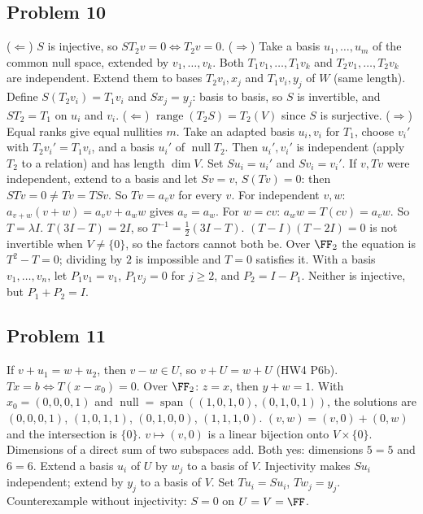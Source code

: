 \documentclass[11pt]{scrartcl}
\DeclareMathOperator{\nul}{null}
\DeclareMathOperator{\range}{range}
\DeclareMathOperator{\spn}{span}
\begin{document}
\subsection*{Problem 10}
\begin{enumerate}[(a)]
  \ii ($\Leftarrow$) $S$ is injective, so $ST_2v=0\iff T_2v=0$.
  ($\Rightarrow$) Take a basis $u_1,\dots,u_m$ of the common null space, extended by $v_1,\dots,v_k$.
  Both $T_1v_1,\dots,T_1v_k$ and $T_2v_1,\dots,T_2v_k$ are independent.
  Extend them to bases $T_2v_i,x_j$ and $T_1v_i,y_j$ of $W$ (same length).
  Define $S(T_2v_i)=T_1v_i$ and $Sx_j=y_j$: basis to basis, so $S$ is invertible, and $ST_2=T_1$ on $u_i$ and $v_i$.
  \ii ($\Leftarrow$) $\range(T_2S)=T_2(V)$ since $S$ is surjective.
  ($\Rightarrow$) Equal ranks give equal nullities $m$.
  Take an adapted basis $u_i,v_i$ for $T_1$, choose $v_i'$ with $T_2v_i'=T_1v_i$, and a basis $u_i'$ of $\nul T_2$.
  Then $u_i',v_i'$ is independent (apply $T_2$ to a relation) and has length $\dim V$.
  Set $Su_i=u_i'$ and $Sv_i=v_i'$.
  \ii If $v,Tv$ were independent, extend to a basis and let $Sv=v$, $S(Tv)=0$: then $STv=0\ne Tv=TSv$.
  So $Tv=a_vv$ for every $v$.
  For independent $v,w$: $a_{v+w}(v+w)=a_vv+a_ww$ gives $a_v=a_w$.
  For $w=cv$: $a_ww=T(cv)=a_vw$.
  So $T=\lambda I$.
  \ii $T(3I-T)=2I$, so $T^{-1}=\tfrac12(3I-T)$.
  $(T-I)(T-2I)=0$ is not invertible when $V\ne\{0\}$, so the factors cannot both be.
  Over $\FF_2$ the equation is $T^2-T=0$; dividing by $2$ is impossible and $T=0$ satisfies it.
  \ii With a basis $v_1,\dots,v_n$, let $P_1v_1=v_1$, $P_1v_j=0$ for $j\ge2$, and $P_2=I-P_1$.
  Neither is injective, but $P_1+P_2=I$.
\end{enumerate}

\subsection*{Problem 11}
\begin{enumerate}[(a)]
  \ii If $v+u_1=w+u_2$, then $v-w\in U$, so $v+U=w+U$ (HW4 P6b).
  \ii $Tx=b\iff T(x-x_0)=0$.
  Over $\FF_2$: $z=x$, then $y+w=1$. With $x_0=(0,0,0,1)$ and $\nul=\spn((1,0,1,0),(0,1,0,1))$, the solutions are
  $(0,0,0,1)$, $(1,0,1,1)$, $(0,1,0,0)$, $(1,1,1,0)$.
  \ii $(v,w)=(v,0)+(0,w)$ and the intersection is $\{0\}$.
  $v\mapsto(v,0)$ is a linear bijection onto $V\times\{0\}$.
  Dimensions of a direct sum of two subspaces add.
  \ii Both yes: dimensions $5=5$ and $6=6$.
  \ii Extend a basis $u_i$ of $U$ by $w_j$ to a basis of $V$.
  Injectivity makes $Su_i$ independent; extend by $y_j$ to a basis of $V$.
  Set $Tu_i=Su_i$, $Tw_j=y_j$.
  Counterexample without injectivity: $S=0$ on $U=V=\FF$.
\end{enumerate}
\end{document}
